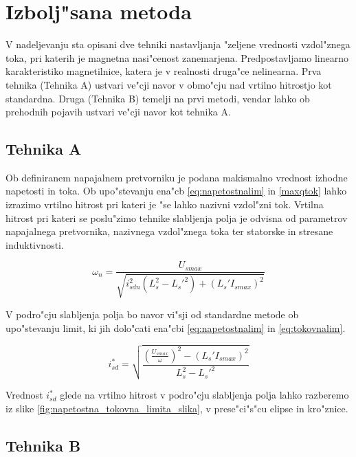 \documentclass[journal,a4paper,twoside]{sty/IEEEtran}
\begin{document}
\section{Izbolj"sana metoda}



V nadeljevanju sta opisani dve tehniki nastavljanja "zeljene vrednosti vzdol"znega toka, pri katerih je magnetna nasi"cenost zanemarjena. Predpostavljamo linearno karakteristiko magnetilnice, katera je v realnosti druga"ce nelinearna. Prva tehnika (Tehnika A) ustvari ve"cji navor v obmo"cju nad vrtilno hitrostjo kot standardna. Druga (Tehnika B) temelji na prvi metodi, vendar lahko ob prehodnih pojavih ustvari ve"cji navor kot tehnika A.\cite{vas}

\subsection{Tehnika A}
\label{sec:prva_metoda}


Ob definiranem napajalnem pretvorniku je podana makismalno vrednost izhodne napetosti in toka. Ob upo"stevanju ena"cb \ref{eq:napetostnalim} in \ref{maxqtok} lahko izrazimo vrtilno hitrost pri kateri je "se lahko nazivni vzdol"zni tok. Vrtilna hitrost pri kateri se poslu"zimo tehnike slabljenja polja je odvisna od parametrov napajalnega pretvornika, nazivnega vzdol"znega toka ter statorske in stresane induktivnosti. 

\begin{equation}
\omega_n=\frac{{U}_{smax}}{\sqrt{i_{sdn}^{2}(L_s^2-L_s'^2)+(L_s'I_{smax})^2}}
\label{nazivnaw}
\end{equation}



V podro"cju slabljenja polja bo navor vi"sji od standardne metode ob upo"stevanju limit, ki jih dolo"cati ena"cbi \ref{eq:napetostnalim} in \ref{eq:tokovnalim}. 

\begin{equation}
\label{eq:zeljentok1}
i_{sd}^*=\sqrt{\frac{(\frac{U_{smax}}{\omega})^2-(L_s'I_{smax})^2}{L_s^2-L_s'^2}}
\end{equation}

Vrednost $i_{sd}^*$ glede na vrtilno hitrost v podro"cju slabljenja polja lahko razberemo iz slike \ref{fig:napetostna_tokovna_limita_slika}, v prese"ci"s"cu elipse in kro"znice. 



\subsection{Tehnika B}
\label{sec:druga_metoda}
\end{document}
